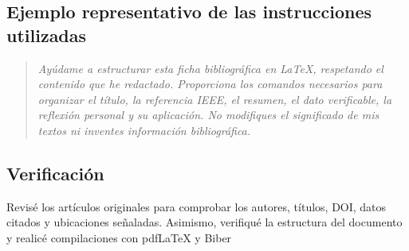 \documentclass[12pt,a4paper]{article}
\begin{document}
\subsection*{Ejemplo representativo de las instrucciones utilizadas}

\begin{quote}
\itshape
Ayúdame a estructurar esta ficha bibliográfica en LaTeX,
respetando el contenido que he redactado. Proporciona
los comandos necesarios para organizar el título, la
referencia IEEE, el resumen, el dato verificable, la
reflexión personal y su aplicación. No modifiques el
significado de mis textos ni inventes información
bibliográfica.
\end{quote}

\subsection*{Verificación}

Revisé los artículos originales para comprobar los autores,
títulos, DOI, datos citados y ubicaciones señaladas.
Asimismo, verifiqué la estructura del documento y realicé
compilaciones con pdfLaTeX y Biber

\begingroup
{}
\printbibliography[title={Referencias bibliográficas}]
\endgroup
\end{document}
